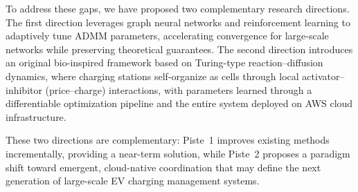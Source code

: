 \documentclass[review]{elsarticle}
\begin{document}
\hspace{0.5cm}To address these gaps, we have proposed two complementary research directions. The first direction leverages graph neural networks and reinforcement learning to adaptively tune ADMM parameters, accelerating convergence for large-scale networks while preserving theoretical guarantees. The second direction introduces an original bio-inspired framework based on Turing-type reaction--diffusion dynamics, where charging stations self-organize as cells through local activator--inhibitor (price--charge) interactions, with parameters learned through a differentiable optimization pipeline and the entire system deployed on AWS cloud infrastructure.

\hspace{0.5cm}These two directions are complementary: Piste~1 improves existing methods incrementally, providing a near-term solution, while Piste~2 proposes a paradigm shift toward emergent, cloud-native coordination that may define the next generation of large-scale EV charging management systems.




\end{document}
